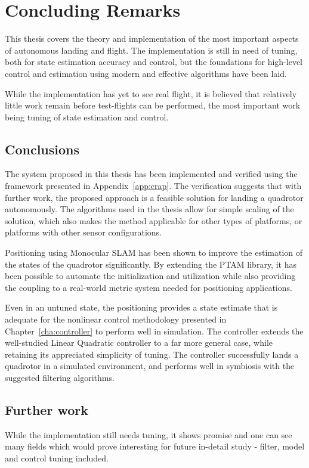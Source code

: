 \chapter{Concluding Remarks}
\label{cha:conclusions}
    This thesis covers the theory and implementation of the most
    important aspects of autonomous landing and flight. The implementation is
    still in need of tuning, both for state estimation accuracy and control,
    but the foundations for high-level control and estimation using
    modern and effective algorithms have been laid.

    While the implementation has yet to see real flight, it is believed
    that relatively little work remain before test-flights can be performed,
    the most important work being tuning of state estimation and control.

\section{Conclusions}
    The system proposed in this thesis has been implemented and verified
    using the framework presented in Appendix~\ref{app:crap}.
    The verification suggests that with further work, the proposed approach
    is a feasible solution for landing a quadrotor autonomously.
    The algorithms used in the thesis allow for
    simple scaling of the solution, which also makes the method applicable
    for other types of platforms, or platforms with other sensor configurations.

    Positioning using Monocular SLAM has been shown to improve the estimation of the states
    of the quadrotor significantly. By extending the PTAM library,
    it has been possible to automate the initialization and utilization
    while also providing the coupling to a real-world metric system needed
    for positioning applications.

    Even in an untuned state, the positioning provides a state estimate
    that is adequate for the nonlinear control methodology presented
    in Chapter~\ref{cha:controller} to perform well in simulation.
    The controller extends the well-studied Linear Quadratic controller
    to a far more general case, while retaining its appreciated simplicity of tuning.
    The controller successfully lands a quadrotor in a simulated environment,
    and performs well in symbiosis with the suggested filtering algorithms.


\section{Further work}
\label{sec:conclusions:furtherwork}
    While the implementation still needs tuning, it shows promise
    and one can see many fields which would prove interesting for
    future in-detail study - filter, model and control tuning included.

